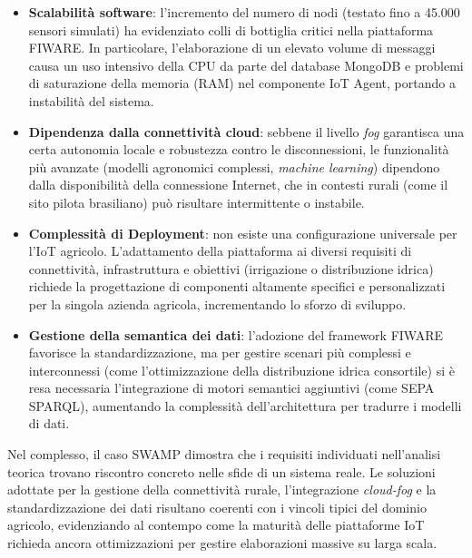 \begin{itemize}
    \item \textbf{Scalabilità software}: l'incremento del numero di nodi (testato fino a 45.000 sensori simulati) ha evidenziato colli di bottiglia critici nella piattaforma FIWARE. %
    In particolare, l'elaborazione di un elevato volume di messaggi causa un uso intensivo della CPU da parte del database MongoDB e problemi di saturazione della memoria (RAM) nel componente IoT Agent, portando a instabilità del sistema. %
    
    \item \textbf{Dipendenza dalla connettività cloud}: sebbene il livello \textit{fog} garantisca una certa autonomia locale e robustezza contro le disconnessioni, le funzionalità più avanzate (modelli agronomici complessi, \textit{machine learning}) dipendono dalla disponibilità della connessione Internet, che in contesti rurali (come il sito pilota brasiliano) può risultare intermittente o instabile. %
    
    \item \textbf{Complessità di Deployment}: non esiste una configurazione universale per l'IoT agricolo. %
    L'adattamento della piattaforma ai diversi requisiti di connettività, infrastruttura e obiettivi (irrigazione o distribuzione idrica) richiede la progettazione di componenti altamente specifici e personalizzati per la singola azienda agricola, incrementando lo sforzo di sviluppo. %
    
    \item \textbf{Gestione della semantica dei dati}: l'adozione del framework FIWARE favorisce la standardizzazione, ma per gestire scenari più complessi e interconnessi (come l'ottimizzazione della distribuzione idrica consortile) si è resa necessaria l'integrazione di motori semantici aggiuntivi (come SEPA SPARQL), aumentando la complessità dell'architettura per tradurre i modelli di dati. %
\end{itemize}

\noindent Nel complesso, il caso SWAMP dimostra che i requisiti individuati nell'analisi teorica trovano riscontro concreto nelle sfide di un sistema reale. %
Le soluzioni adottate per la gestione della connettività rurale, l'integrazione \textit{cloud-fog} e la standardizzazione dei dati risultano coerenti con i vincoli tipici del dominio agricolo, evidenziando al contempo come la maturità delle piattaforme IoT richieda ancora ottimizzazioni per gestire elaborazioni massive su larga scala. %